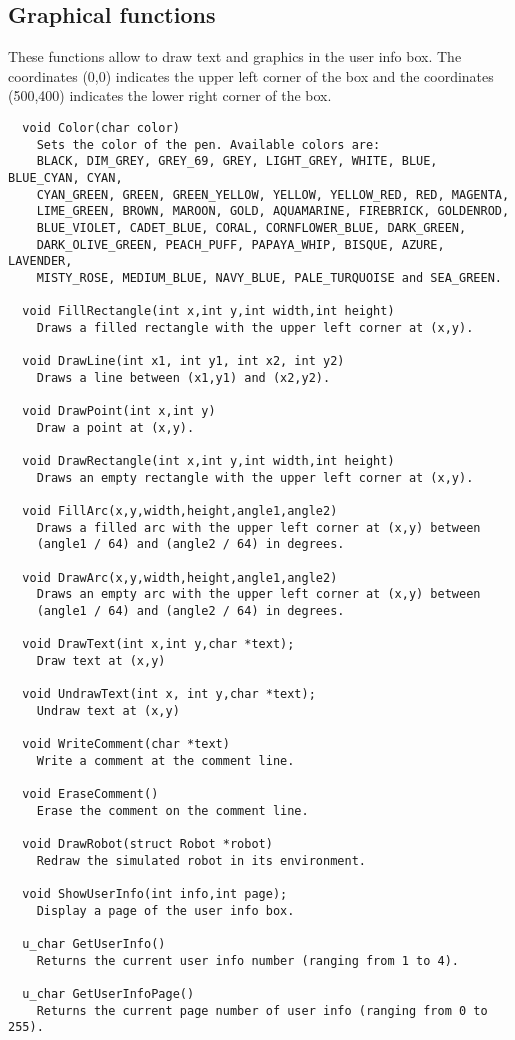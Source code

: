 \documentclass[a4paper,twoside]{article}
\begin{document}
\subsection{Graphical functions \label{graphics_functions}}

These functions allow to draw text and graphics in the user info box. The
coordinates (0,0) indicates the upper left corner of the box and the
coordinates (500,400) indicates the lower right corner of the box.

\begin{verbatim}
  void Color(char color)
    Sets the color of the pen. Available colors are:
    BLACK, DIM_GREY, GREY_69, GREY, LIGHT_GREY, WHITE, BLUE, BLUE_CYAN, CYAN,
    CYAN_GREEN, GREEN, GREEN_YELLOW, YELLOW, YELLOW_RED, RED, MAGENTA, 
    LIME_GREEN, BROWN, MAROON, GOLD, AQUAMARINE, FIREBRICK, GOLDENROD,
    BLUE_VIOLET, CADET_BLUE, CORAL, CORNFLOWER_BLUE, DARK_GREEN,
    DARK_OLIVE_GREEN, PEACH_PUFF, PAPAYA_WHIP, BISQUE, AZURE, LAVENDER,
    MISTY_ROSE, MEDIUM_BLUE, NAVY_BLUE, PALE_TURQUOISE and SEA_GREEN.

  void FillRectangle(int x,int y,int width,int height)
    Draws a filled rectangle with the upper left corner at (x,y).

  void DrawLine(int x1, int y1, int x2, int y2)
    Draws a line between (x1,y1) and (x2,y2).

  void DrawPoint(int x,int y)
    Draw a point at (x,y).

  void DrawRectangle(int x,int y,int width,int height)
    Draws an empty rectangle with the upper left corner at (x,y).

  void FillArc(x,y,width,height,angle1,angle2)
    Draws a filled arc with the upper left corner at (x,y) between
    (angle1 / 64) and (angle2 / 64) in degrees.

  void DrawArc(x,y,width,height,angle1,angle2)
    Draws an empty arc with the upper left corner at (x,y) between
    (angle1 / 64) and (angle2 / 64) in degrees.

  void DrawText(int x,int y,char *text);
    Draw text at (x,y)

  void UndrawText(int x, int y,char *text);
    Undraw text at (x,y)

  void WriteComment(char *text)
    Write a comment at the comment line.

  void EraseComment()
    Erase the comment on the comment line.

  void DrawRobot(struct Robot *robot)
    Redraw the simulated robot in its environment.

  void ShowUserInfo(int info,int page);
    Display a page of the user info box.

  u_char GetUserInfo()
    Returns the current user info number (ranging from 1 to 4).

  u_char GetUserInfoPage()
    Returns the current page number of user info (ranging from 0 to 255).

\end{verbatim}
\end{document}
